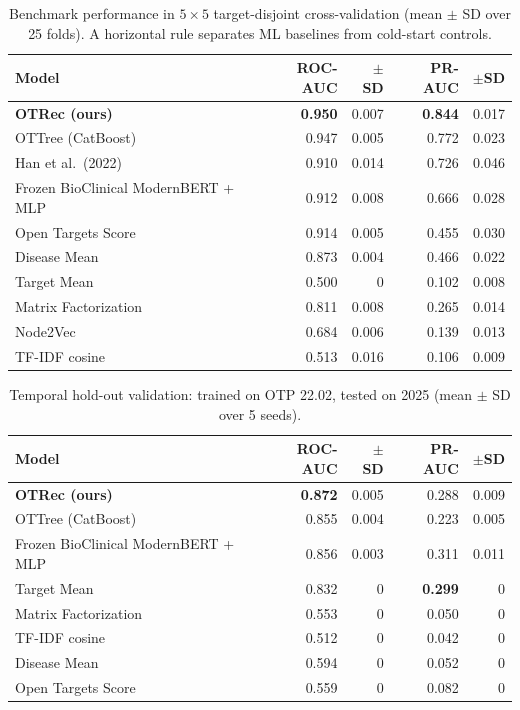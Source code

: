 \documentclass{article}
\begin{document}
\begin{table}[t]
\caption{Benchmark performance in $5{\times}5$ target-disjoint
cross-validation (mean $\pm$ SD over 25 folds). A horizontal rule
separates ML baselines from cold-start controls.}
\label{tab:cv}
\centering\small
\setlength{\tabcolsep}{5pt}
\begin{tabular}{@{}lrrrr@{}}
\toprule
Model & ROC-AUC & ${\pm}$SD & PR-AUC & ${\pm}$SD \\
\midrule
\textbf{OTRec (ours)}  & \textbf{0.950} & 0.007 & \textbf{0.844} & 0.017 \\
OTTree (CatBoost)      & 0.947 & 0.005 & 0.772 & 0.023 \\
Han et al.\ (2022)     & 0.910 & 0.014 & 0.726 & 0.046 \\
Frozen BioClinical ModernBERT + MLP & 0.912 & 0.008 & 0.666 & 0.028 \\
\midrule
Open Targets Score     & 0.914 & 0.005 & 0.455 & 0.030 \\
Disease Mean           & 0.873 & 0.004 & 0.466 & 0.022 \\
Target Mean            & 0.500 & 0 & 0.102 & 0.008 \\
Matrix Factorization   & 0.811 & 0.008 & 0.265 & 0.014 \\
Node2Vec               & 0.684 & 0.006 & 0.139 & 0.013 \\
TF-IDF cosine          & 0.513 & 0.016 & 0.106 & 0.009 \\
\bottomrule
\end{tabular}
\end{table}

\begin{table}[t]
\caption{Temporal hold-out validation: trained on OTP 22.02, tested
on 2025 %
 (mean $\pm$ SD over 5 seeds).}
\label{tab:temporal}
\centering\small
\begin{tabular}{@{}lrrrr@{}}
\toprule
Model & ROC-AUC & ${\pm}$SD & PR-AUC & ${\pm}$SD \\
\midrule
\textbf{OTRec (ours)} & \textbf{0.872} & 0.005 & 0.288 & 0.009 \\
OTTree (CatBoost)     & 0.855 & 0.004 & 0.223 & 0.005 \\
Frozen BioClinical ModernBERT + MLP & 0.856 & 0.003 & 0.311 & 0.011 \\
Target Mean           & 0.832 & 0 & \textbf{0.299} & 0 \\
Matrix Factorization  & 0.553 & 0 & 0.050 & 0 \\
TF-IDF cosine         & 0.512 & 0 & 0.042 & 0 \\
Disease Mean          & 0.594 & 0 & 0.052 & 0 \\
Open Targets Score    & 0.559 & 0 & 0.082 & 0 \\
\bottomrule
\end{tabular}
\end{table}
\end{document}
